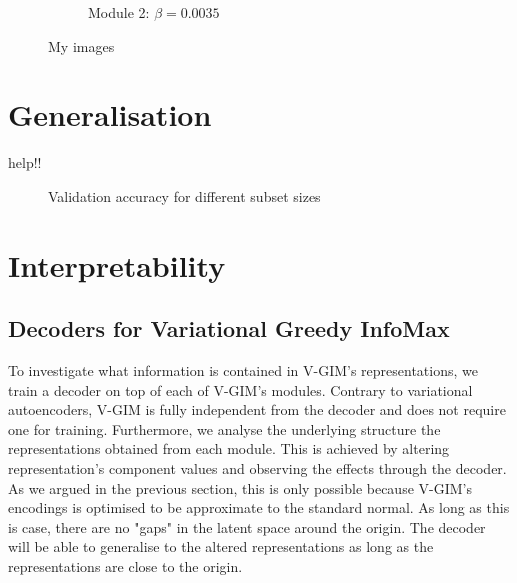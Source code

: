 \begin{figure}[ht]
\begin{subfigure}{0.45\linewidth}
					\caption{Module 2: $\beta=0.0035$}
					\label{fig:t-sne-kld0-module-2}
				\end{subfigure}
				\caption{My images}
				\label{fig:myimages}
			\end{figure}
		
		
		
	
		
		
		
	
	
	
	


	



\section{Generalisation}
help!!

\begin{figure}[h] %
	\centering
	\begin{subfigure}[b]{0.4\textwidth}
		\centering
		
	\end{subfigure}
	\hfill
	\begin{subfigure}[b]{0.4\textwidth}
		\centering
		
	\end{subfigure}
	\caption{Validation accuracy for different subset sizes}
\end{figure}






	


\section{Interpretability}

	\subsection{Decoders for Variational Greedy InfoMax}
		To investigate what information is contained in V-GIM's representations, we train a decoder on top of each of V-GIM's modules. Contrary to variational autoencoders, V-GIM is fully independent from the decoder and does not require one for training. Furthermore, we analyse the underlying structure the representations obtained from each module. This is achieved by altering representation's component values and observing the effects through the decoder. As we argued in the previous section, this is only possible because V-GIM's encodings is optimised to be approximate to the standard normal. As long as this is case, there are no "gaps" in the latent space around the origin. The decoder will be able to generalise to the altered representations as long as the representations are close to the origin.
		
